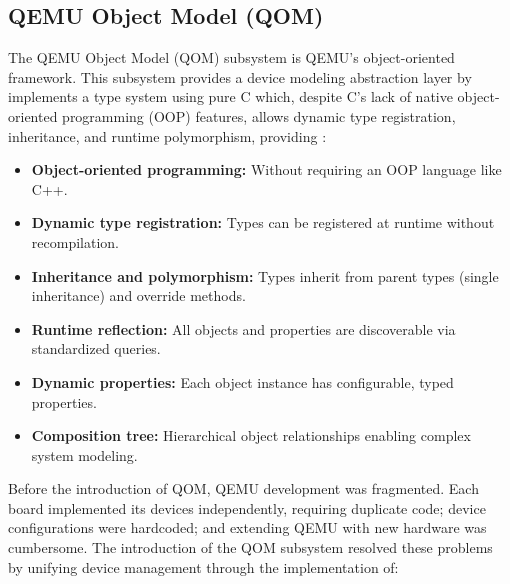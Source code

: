 \subsection{QEMU Object Model (QOM)}
\label{chap:QEMU_QOM}

The QEMU Object Model (QOM) subsystem is QEMU's object-oriented framework. 
This subsystem provides a device modeling abstraction layer by implements a 
type system using pure C which, despite C's lack of native object-oriented programming 
(OOP) features, allows dynamic type registration, inheritance, and runtime 
polymorphism, providing\cite{Bellard2005Qemu} \cite{Qemu_QOM}:

\begin{itemize}
    \item \textbf{Object-oriented programming:    }Without requiring an OOP 
                                                    language like C++.

    \item \textbf{Dynamic type registration:      }Types can be registered at runtime without 
                                                    recompilation.
    
    \item \textbf{Inheritance and polymorphism:   }Types inherit from parent types (single 
                                                    inheritance) and override methods.
    
    \item \textbf{Runtime reflection:             }All objects and properties are 
                                                    discoverable via standardized queries.
    
    \item \textbf{Dynamic properties:             }Each object instance has configurable, 
                                                    typed properties.
    
    \item \textbf{Composition tree:               }Hierarchical object relationships enabling complex 
                                                    system modeling.
\end{itemize}

Before the introduction of QOM, QEMU development was fragmented. Each 
board implemented its devices independently, requiring duplicate code; device 
configurations were hardcoded; and extending QEMU with new hardware was cumbersome. 
The introduction of the QOM subsystem resolved these problems by unifying 
device management through the implementation of:

